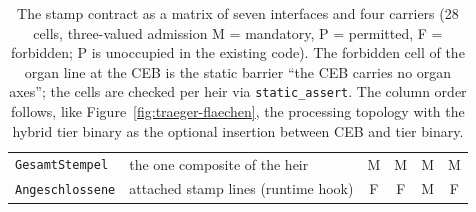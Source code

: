 \begin{nurlang}
\begin{table}[htbp]
\begin{tabular}{@{}llcccc@{}}
\texttt{GesamtStempel}  & the one composite of the heir                     & M & M & M & M \\
\texttt{Angeschlossene} & attached stamp lines (runtime hook)               & F & F & M & F \\
\bottomrule
\end{tabular}
\caption{The stamp contract as a matrix of seven interfaces and four carriers (28 cells, three-valued
admission M = mandatory, P = permitted, F = forbidden; P is unoccupied in the existing code). The
forbidden cell of the organ line at the CEB is the static barrier \enquote{the CEB carries no organ axes};
the cells are checked per heir via \texttt{static\_assert}. The column order follows, like
Figure~\ref{fig:traeger-flaechen}, the processing topology with the hybrid tier binary as the optional
insertion between CEB and tier binary.}\label{tab:stempel-matrix}
\end{table}
\end{nurlang}
